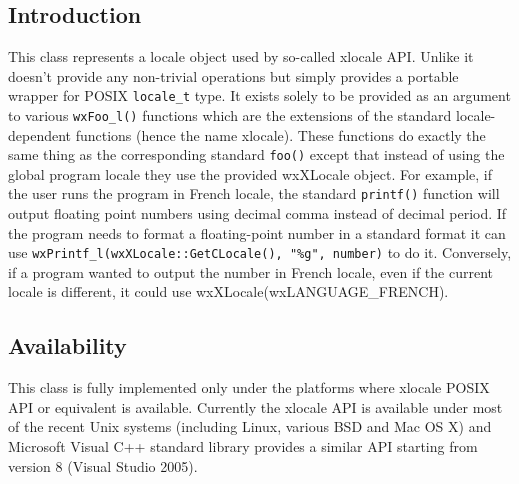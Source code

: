 
\section{}\label{wxxlocale}

\subsection{Introduction}

This class represents a locale object used by so-called xlocale API. Unlike 
 it doesn't provide any non-trivial operations but
simply provides a portable wrapper for POSIX \texttt{locale\_t} type. It exists
solely to be provided as an argument to various \texttt{wxFoo\_l()} functions
which are the extensions of the standard locale-dependent functions (hence the
name xlocale). These functions do exactly the same thing as the corresponding
standard \texttt{foo()} except that instead of using the global program locale
they use the provided wxXLocale object. For example, if the user runs the
program in French locale, the standard \texttt{printf()} function will output
floating point numbers using decimal comma instead of decimal period. If the
program needs to format a floating-point number in a standard format it can
use \texttt{wxPrintf\_l(wxXLocale::GetCLocale(), "\%g", number)} to do it.
Conversely, if a program wanted to output the number in French locale, even if
the current locale is different, it could use wxXLocale(wxLANGUAGE\_FRENCH).

\subsection{Availability}

This class is fully implemented only under the platforms where xlocale POSIX
API or equivalent is available. Currently the xlocale API is available under
most of the recent Unix systems (including Linux, various BSD and Mac OS X) and
Microsoft Visual C++ standard library provides a similar API starting from
version 8 (Visual Studio 2005).

